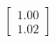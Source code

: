 \documentclass[preview]{standalone}
\begin{document}
\begin{align*}
\begin{bmatrix} 1.00 \\ 1.02 \end{bmatrix}
\end{align*}
\end{document}
